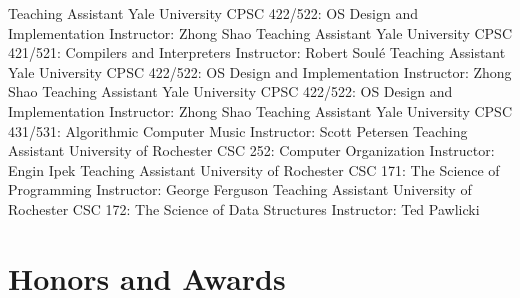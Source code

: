 \documentclass[10pt,letterpaper,sans]{moderncv}
\begin{document}
        {Teaching Assistant}
        {Yale University}
        {CPSC 422/522: OS Design and Implementation}
        {}
        {Instructor: Zhong Shao}
        {Teaching Assistant}
        {Yale University}
        {CPSC 421/521: Compilers and Interpreters}
        {}
        {Instructor: Robert Soul{\'e}}
        {Teaching Assistant}
        {Yale University}
        {CPSC 422/522: OS Design and Implementation}
        {}
        {Instructor: Zhong Shao}
        {Teaching Assistant}
        {Yale University}
        {CPSC 422/522: OS Design and Implementation}
        {}
        {Instructor: Zhong Shao}
        {Teaching Assistant}
        {Yale University}
        {CPSC 431/531: Algorithmic Computer Music}
        {}
        {Instructor: Scott Petersen}
        {Teaching Assistant}
        {University of Rochester}
        {CSC 252: Computer Organization}
        {}
        {Instructor: Engin Ipek}
        {Teaching Assistant}
        {University of Rochester}
        {CSC 171: The Science of Programming}
        {}
        {Instructor: George Ferguson}
        {Teaching Assistant}
        {University of Rochester}
        {CSC 172: The Science of Data Structures}
        {}
        {Instructor: Ted Pawlicki}

\section{Honors and Awards}


\nocite{*}


\end{document}
